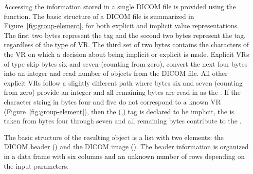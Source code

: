 \documentclass[article,nojss,shortnames]{jss}
\begin{document}
Accessing the information stored in a single DICOM file is provided
using the  function.  The basic structure of a DICOM
file is summarized in Figure~\ref{fig:group-element}, for both
explicit and implicit value representations.  The first two bytes
represent the  tag and the second two bytes represent the
 tag, regardless of the type of VR.  The third set of
two bytes contains the characters of the VR on which a decision about
being implicit or explicit is made.  Explicit VRs of type  skip bytes six and seven (counting from zero),
convert the next four bytes into an integer  and read
 number of objects from the DICOM file.  All other
explicit VRs follow a slightly different path where bytes six and
seven (counting from zero) provide an integer  and all
remaining bytes are read in as the .  If the character
string in bytes four and five do not correspond to a known VR
(Figure~\ref{fig:group-element}), then the
(,) tag is declared to be implicit, the
 is taken from bytes four through seven and all remaining
bytes contribute to the .

The basic structure of the resulting object is a list with two
elements: the DICOM header () and the DICOM image
().  The header information is organized in a data frame
with six columns and an unknown number of rows depending on the input
parameters.
\end{document}
